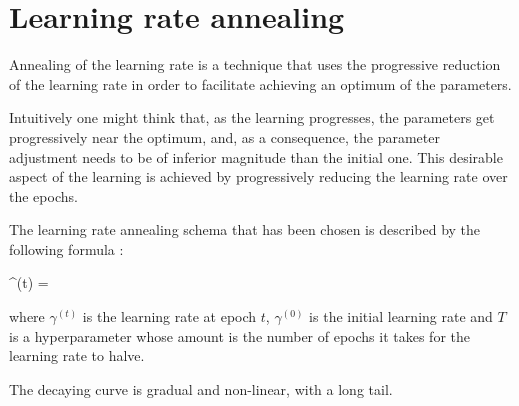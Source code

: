 \section{Learning rate annealing}

Annealing of the learning rate is a technique that uses the progressive reduction
of the learning rate in order to facilitate achieving an optimum of the parameters.

Intuitively one might think that, as the learning progresses, the parameters 
get progressively near the optimum, and, as a consequence, 
the parameter adjustment needs to be of inferior magnitude than the initial one.
This desirable aspect of the learning is achieved by progressively reducing the
learning rate over the epochs.

The learning rate annealing schema that has been chosen is described by the following
formula \cite{annealing}:

\begin{nalign}
\gamma^{(t)} = 
\end{nalign}

where $\gamma^{(t)}$ is the learning rate at epoch $t$,
$\gamma^{(0)}$ is the initial learning rate
and $T$ is a hyperparameter whose amount
is the number of epochs it takes for the learning rate
to halve.

The decaying curve is gradual and non-linear, with a long tail.
